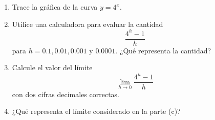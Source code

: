 \item 
\begin{enumerate}
    \item[(a)] Trace la gráfica de la curva $y = 4^x$.
    \item[(b)] Utilice una calculadora para evaluar la cantidad
    $$\frac{4^h - 1}{h}$$
    para $h = 0.1, 0.01, 0.001$ y $0.0001$. ¿Qué representa la cantidad?
    \item[(c)] Calcule el valor del límite
    $$\lim_{h \to 0} \frac{4^h - 1}{h}$$
    con dos cifras decimales correctas.
    \item[(d)] ¿Qué representa el límite considerado en la parte (c)?
\end{enumerate}
